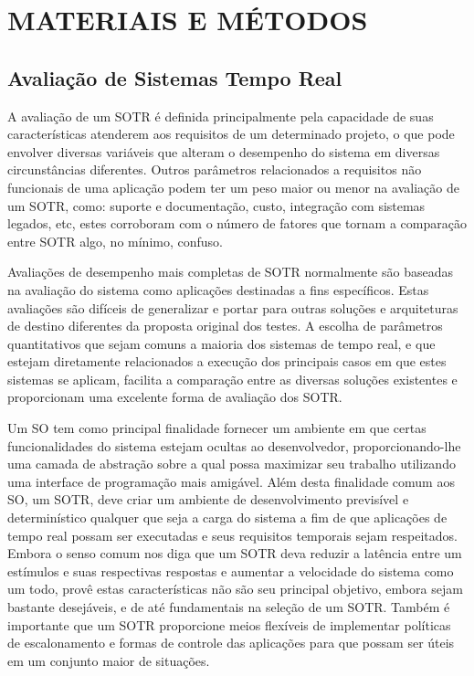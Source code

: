 \chapter{MATERIAIS E MÉTODOS}
\label{cap:projeto}

\section{Avaliação de Sistemas Tempo Real}
A avaliação de um SOTR é definida principalmente pela capacidade de suas características atenderem aos requisitos de um determinado projeto, o que pode envolver diversas variáveis que alteram o desempenho do sistema em diversas circunstâncias diferentes. Outros parâmetros relacionados a requisitos não funcionais de uma aplicação podem ter um peso maior ou menor na avaliação de um SOTR, como: suporte e documentação, custo, integração com sistemas legados, etc, estes corroboram com o número de fatores que tornam a comparação entre SOTR algo, no mínimo, confuso.

Avaliações de desempenho mais completas de SOTR normalmente são baseadas na avaliação do sistema como aplicações destinadas a fins específicos. Estas avaliações são difíceis de generalizar e portar para outras soluções e arquiteturas de destino diferentes da proposta original dos testes. A escolha de parâmetros quantitativos que sejam comuns a maioria dos sistemas de tempo real, e que estejam diretamente relacionados a execução dos principais casos em que estes sistemas se aplicam, facilita a comparação entre as diversas soluções existentes e proporcionam uma excelente forma de avaliação dos SOTR.

Um SO tem como principal finalidade fornecer um ambiente em que certas funcionalidades do sistema estejam ocultas ao desenvolvedor, proporcionando-lhe uma camada de abstração sobre a qual possa maximizar seu trabalho utilizando uma interface de programação mais amigável. Além desta finalidade comum aos SO, um SOTR, deve criar um ambiente de desenvolvimento previsível e determinístico qualquer que seja a carga do sistema a fim de que aplicações de tempo real possam ser executadas e seus requisitos temporais sejam respeitados. Embora o senso comum nos diga que um SOTR deva reduzir a latência entre um estímulos e suas respectivas respostas e aumentar a velocidade do sistema como um todo, provê estas características não são seu principal objetivo, embora sejam bastante desejáveis, e de até fundamentais na seleção de um SOTR. Também é importante que um SOTR proporcione meios flexíveis de implementar políticas de escalonamento e formas de controle das aplicações para que possam ser úteis em um conjunto maior de situações.

